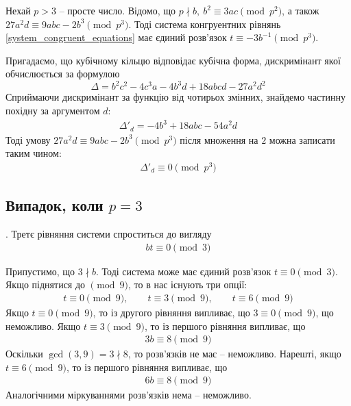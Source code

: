 \documentclass{thesis}
\begin{document}
\begin{lemma}
\label{system_when_p_is_prime_and_bigger_than_three}
Нехай $p > 3$ -- просте число. Відомо, що $p \nmid b,\ b^2 \equiv 3ac \pmod {p^2}$, а також $27a^2d \equiv 9abc - 2b^3 \pmod {p^3}$. Тоді система конгруентних рівнянь \eqref{system_congruent_equations} має єдиний розв'язок $t \equiv -3 b^{-1} \pmod {p^3}$.
\end{lemma}

Пригадаємо, що кубічному кільцю відповідає кубічна форма, дискримінант якої обчислюється за формулою
\begin{equation}
\Delta = b^2 c^2 - 4c^3 a - 4 b^3 d + 18 abcd - 27a^2d^2
\end{equation}
Сприймаючи дискримінант за функцію від чотирьох змінних, знайдемо частинну похідну за аргументом $d$:
\begin{align*}
\Delta'_d = -4b^3 + 18 abc - 54a^2 d
\end{align*}
Тоді умову $27a^2d \equiv 9abc - 2b^3 \pmod {p^3}$ після множення на $2$ можна записати таким чином:
\begin{align*}
\Delta'_d \equiv 0 \pmod {p^3}
\end{align*}

\subsection{Випадок, коли $p = 3$}. Третє рівняння системи спроститься до вигляду
\begin{align*}
bt \equiv 0 \pmod 3
\end{align*}

Припустимо, що $3 \nmid b$. Тоді система може має єдиний розв'язок $t \equiv 0 \pmod 3$. Якщо піднятися до $\pmod 9$, то в нас існують три опції:
\begin{align*}
t \equiv 0 \pmod 9,\qquad t \equiv 3 \pmod 9,\qquad t \equiv 6 \pmod 9
\end{align*}
Якщо $t \equiv 0 \pmod 9$, то із другого рівняння випливає, що $3 \equiv 0 \pmod 9$, що неможливо. Якщо $t \equiv 3 \pmod 9$, то із першого рівняння випливає, що
\begin{align*}
3b \equiv 8 \pmod 9
\end{align*}
Оскільки $\gcd(3,9) = 3 \nmid 8$, то розв'язків не має -- неможливо. Нарешті, якщо $t \equiv 6 \pmod 9$, то із першого рівняння випливає, що
\begin{align*}
6b \equiv 8 \pmod 9
\end{align*}
Аналогічними міркуваннями розв'язків нема -- неможливо.
\end{document}
